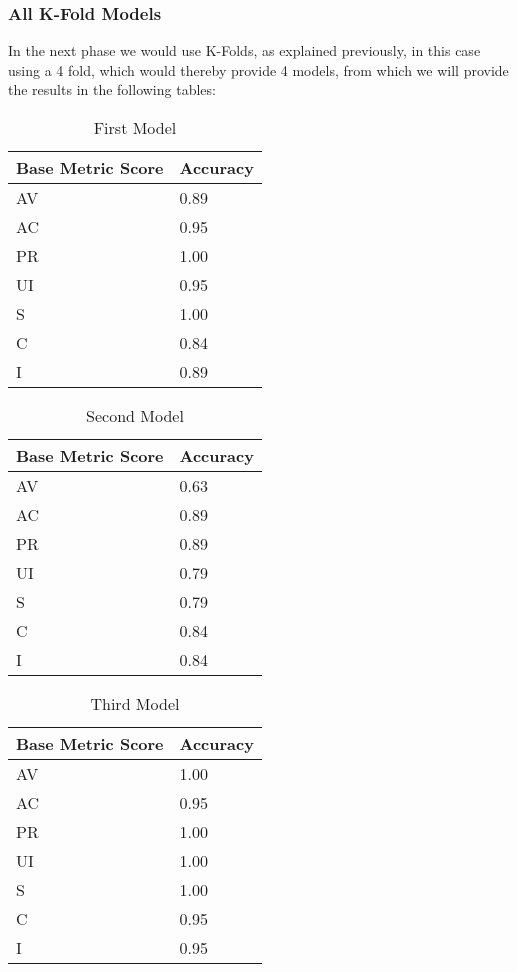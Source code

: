 \subsubsection{All K-Fold Models}

In the next phase we would use K-Folds, as explained previously, in this case using a 4 fold, which would thereby provide 4 models, from which we will provide the results in the following tables:

\begin{table}[H]
	\centering
	\caption{First Model}
	\begin{tabular}{ |p{4cm}||p{10cm}|  }
		\hline
		Base Metric Score & Accuracy\\
		\hline
		AV   & 0.89 \\ 
		AC &   0.95  \\
		PR & 1.00  \\
		UI    & 0.95  \\
		S   & 1.00  \\
		C   & 0.84 \\
		I    & 0.89  \\
		\hline
	\end{tabular}
\end{table}

\begin{table}[H]
	\centering
	\caption{Second Model}
	\begin{tabular}{ |p{4cm}||p{10cm}|  }
		\hline
		Base Metric Score & Accuracy\\
		\hline
		AV   & 0.63 \\ 
		AC &   0.89  \\
		PR & 0.89  \\
		UI    & 0.79  \\
		S   & 0.79  \\
		C   & 0.84 \\
		I    & 0.84  \\
		\hline
	\end{tabular}
\end{table}

\begin{table}[H]
	\centering
	\caption{Third Model}
	\begin{tabular}{ |p{4cm}||p{10cm}|  }
		\hline
		Base Metric Score & Accuracy\\
		\hline
		AV   & 1.00 \\ 
		AC &   0.95  \\
		PR & 1.00  \\
		UI    & 1.00  \\
		S   & 1.00  \\
		C   & 0.95 \\
		I    & 0.95  \\
		\hline
	\end{tabular}
\end{table}


